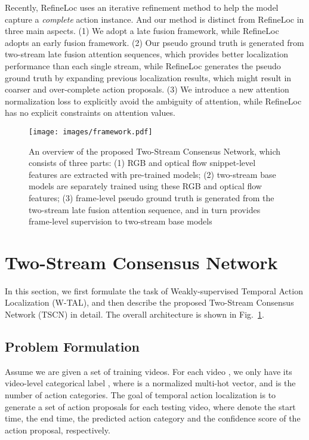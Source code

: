 \documentclass[runningheads]{llncs}
\begin{document}
Recently, RefineLoc \cite{alwassel2019refineloc} uses an iterative refinement method to help the model capture a \textit{complete} action instance.
And our method is distinct from RefineLoc in three main aspects. 
(1) We adopt a late fusion framework, while RefineLoc adopts an early fusion framework.
(2) Our pseudo ground truth is generated from two-stream late fusion attention sequences, which provides better localization performance than each single stream, while RefineLoc generates the pseudo ground truth by expanding previous localization results, which might result in coarser and over-complete action proposals.
(3) We introduce a new attention normalization loss to explicitly avoid the ambiguity of attention, while RefineLoc has no explicit constraints on attention values.


\begin{figure}[t]
	\centering
	\texttt{[image: images/framework.pdf]}
	\caption{An overview of the proposed Two-Stream Consensus Network, which consists of three parts: (1) RGB and optical flow snippet-level features are extracted with pre-trained models; (2) two-stream base models are separately trained using these RGB and optical flow features; (3) frame-level pseudo ground truth is generated from the two-stream late fusion attention sequence, and in turn provides frame-level supervision to two-stream base models}
	\label{fig:framework}
\end{figure}

\section{Two-Stream Consensus Network}
In this section, we first formulate the task of Weakly-supervised Temporal Action Localization (W-TAL), and then describe the proposed Two-Stream Consensus Network (TSCN) in detail. The overall architecture is shown in Fig.~\ref{fig:framework}.

\subsection{Problem Formulation}
Assume we are given a set of training videos. For each video , we only have its video-level categorical label , where  is a normalized multi-hot vector, and  is the number of action categories. The goal of temporal action localization is to generate a set of action proposals  for each testing video, where  denote the start time, the end time, the predicted action category and the confidence score of the action proposal, respectively.
\end{document}
